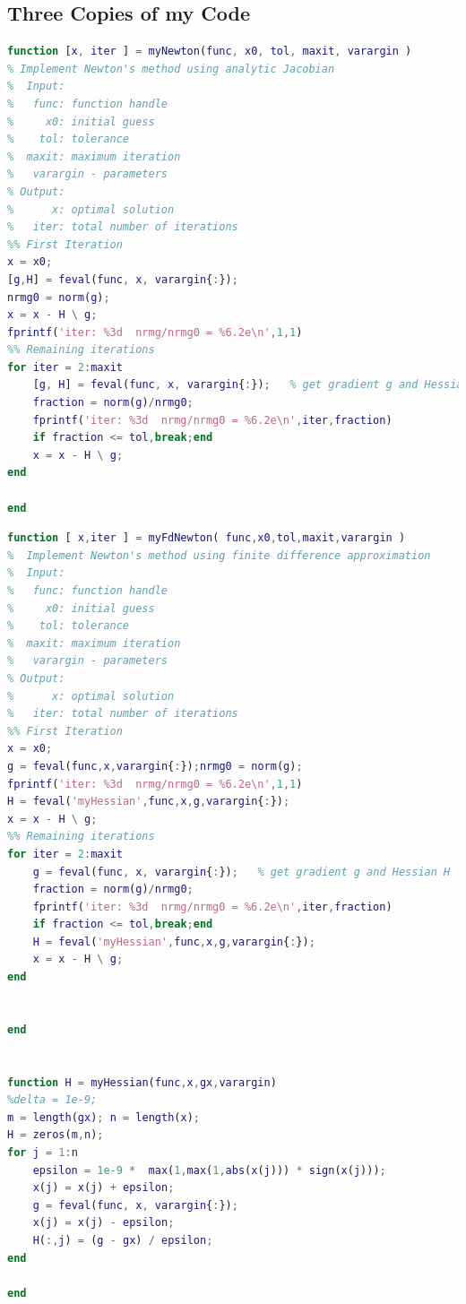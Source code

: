 \subsection{Three Copies of my Code}
\begin{lstlisting}[language=matlab]
function [x, iter ] = myNewton(func, x0, tol, maxit, varargin )
% Implement Newton's method using analytic Jacobian
%  Input:
%   func: function handle
%     x0: initial guess
%    tol: tolerance
%  maxit: maximum iteration
%   varargin - parameters
% Output:
%      x: optimal solution
%   iter: total number of iterations
%% First Iteration
x = x0;
[g,H] = feval(func, x, varargin{:});
nrmg0 = norm(g);
x = x - H \ g;
fprintf('iter: %3d  nrmg/nrmg0 = %6.2e\n',1,1)
%% Remaining iterations
for iter = 2:maxit
    [g, H] = feval(func, x, varargin{:});   % get gradient g and Hessian H
    fraction = norm(g)/nrmg0;
    fprintf('iter: %3d  nrmg/nrmg0 = %6.2e\n',iter,fraction)
    if fraction <= tol,break;end
    x = x - H \ g;
end

end
\end{lstlisting}
\begin{lstlisting}[language=matlab]
function [ x,iter ] = myFdNewton( func,x0,tol,maxit,varargin )
%  Implement Newton's method using finite difference approximation
%  Input:
%   func: function handle
%     x0: initial guess
%    tol: tolerance
%  maxit: maximum iteration
%   varargin - parameters
% Output:
%      x: optimal solution
%   iter: total number of iterations
%% First Iteration
x = x0;
g = feval(func,x,varargin{:});nrmg0 = norm(g);
fprintf('iter: %3d  nrmg/nrmg0 = %6.2e\n',1,1)
H = feval('myHessian',func,x,g,varargin{:});
x = x - H \ g;
%% Remaining iterations
for iter = 2:maxit
    g = feval(func, x, varargin{:});   % get gradient g and Hessian H
    fraction = norm(g)/nrmg0;
    fprintf('iter: %3d  nrmg/nrmg0 = %6.2e\n',iter,fraction)
    if fraction <= tol,break;end
    H = feval('myHessian',func,x,g,varargin{:});
    x = x - H \ g;
end


end


function H = myHessian(func,x,gx,varargin)
%delta = 1e-9;
m = length(gx); n = length(x);
H = zeros(m,n);
for j = 1:n
    epsilon = 1e-9 *  max(1,max(1,abs(x(j))) * sign(x(j)));
    x(j) = x(j) + epsilon;
    g = feval(func, x, varargin{:});
    x(j) = x(j) - epsilon;
    H(:,j) = (g - gx) / epsilon;
end

end
\end{lstlisting}
